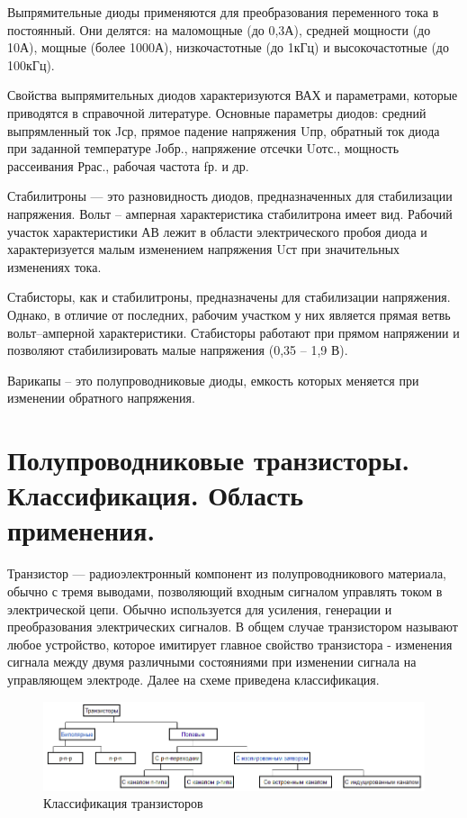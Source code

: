\documentclass[unicode, 12pt, a4paper, oneside]{article}
\begin{document}
Выпрямительные диоды применяются для преобразования переменного тока в постоянный. Они делятся: на маломощные (до 0,3А), средней мощности (до 10А), мощные (более 1000А), низкочастотные (до 1кГц) и высокочастотные (до 100кГц).

Свойства выпрямительных диодов характеризуются ВАХ и параметрами, которые приводятся в справочной литературе. Основные параметры диодов: средний выпрямленный ток Jср, прямое падение напряжения Uпр, обратный ток диода при заданной температуре Jобр., напряжение отсечки Uотс., мощность рассеивания Ррас., рабочая частота fр. и др.

Стабилитроны --- это разновидность диодов, предназначенных для стабилизации напряжения. Вольт – амперная характеристика стабилитрона имеет вид. Рабочий участок характеристики АВ лежит в области электрического пробоя диода и характеризуется малым изменением напряжения Uст при значительных изменениях тока.

Стабисторы, как и стабилитроны, предназначены для стабилизации напряжения. Однако, в отличие от последних, рабочим участком у них является прямая ветвь вольт–амперной характеристики. Стабисторы работают при прямом напряжении и позволяют стабилизировать малые напряжения (0,35 -- 1,9 В).

Варикапы – это полупроводниковые диоды, емкость которых меняется при изменении обратного напряжения.


\section{Полупроводниковые транзисторы. Классификация. Область применения.}

Транзистор — радиоэлектронный компонент из полупроводникового материала, обычно с тремя выводами, позволяющий входным сигналом управлять током в электрической цепи. Обычно используется для усиления, генерации и преобразования электрических сигналов. В общем случае транзистором называют любое устройство, которое имитирует главное свойство транзистора - изменения сигнала между двумя различными состояниями при изменении сигнала на управляющем электроде. Далее на схеме приведена классификация.

\begin{figure}[H]
\centering
\includegraphics[width=1.0\textwidth]{3_Scheme_of_types.png}
\caption{Классификация транзисторов}
\label{fig:3_Scheme_of_types}
\end{figure}
\end{document}
